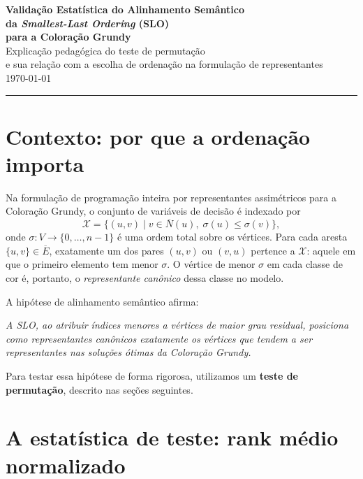 \documentclass[a4paper,11pt]{article}
\begin{document}
\begin{center}
  {\LARGE\bfseries\color{azul}
    Validação Estatística do Alinhamento Semântico\\[4pt]
    da \textit{Smallest-Last Ordering} (SLO)\\[6pt]
    para a Coloração Grundy}\\[10pt]
  {\normalsize Explicação pedagógica do teste de permutação\\
  e sua relação com a escolha de ordenação na formulação de representantes}\\[4pt]
  {\small \today}
\end{center}

\noindent\rule{\linewidth}{1pt}

\section{Contexto: por que a ordenação importa}

Na formulação de programação inteira por representantes assimétricos
para a Coloração Grundy, o conjunto de variáveis de decisão é indexado
por
\[
  \mathcal{X} = \bigl\{(u,v) \;\big|\; v \in \overline{N}(u),\;
  \sigma(u) \leq \sigma(v)\bigr\},
\]
onde $\sigma : V \to \{0,\ldots,n-1\}$ é uma ordem total sobre os
vértices. Para cada aresta $\{u,v\} \in \overline{E}$, exatamente um
dos pares $(u,v)$ ou $(v,u)$ pertence a $\mathcal{X}$: aquele em que
o primeiro elemento tem menor $\sigma$. O vértice de menor $\sigma$
em cada classe de cor é, portanto, o \emph{representante canônico}
dessa classe no modelo.

A hipótese de alinhamento semântico afirma:

\begin{center}
\itshape
A SLO, ao atribuir índices menores a vértices de maior grau residual,
posiciona como representantes canônicos exatamente os vértices que
tendem a ser representantes nas soluções ótimas da Coloração Grundy.
\end{center}

Para testar essa hipótese de forma rigorosa, utilizamos um
\textbf{teste de permutação}, descrito nas seções seguintes.

\section{A estatística de teste: rank médio normalizado}
\end{document}
